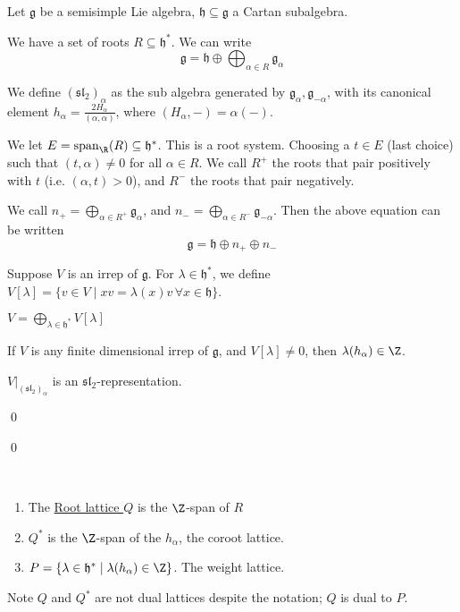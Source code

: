 \documentclass[x11names,reqno,14pt]{extarticle}
\newcommand{\mk}[1]{\mathfrak{#1}}
\newcommand{\g}{\mk{g}}
\newcommand{\h}{\mk{h}}
\renewcommand{\sl}{\mk{s}\mk{l}}
\DeclareMathOperator{\Span}{span}
\begin{document}
Let $\g$ be a semisimple Lie algebra, $\h \subseteq \g$ a Cartan subalgebra. 

We have a set of roots $R \subseteq \h^*$. We can write 
\[
\g = \h \oplus \bigoplus_{\alpha\in R}\g_\alpha
\]

We define $(\sl_2)_\alpha$ as the sub algebra generated by $\g_\alpha,\g_{-\alpha}$, with its canonical element $h_\alpha = \frac{2H_\alpha}{(\alpha,\alpha)}$, where $(H_\alpha,-) = \alpha(-)$. 

We let $E = \Span_\R(R)\subseteq\h^*$. This is a root system. Choosing a $t \in E$ (last choice) such that $(t,\alpha)\neq0$ for all $\alpha \in R$. We call $R^+$ the roots that pair positively with $t$ (i.e. $(\alpha,t) > 0$), and $R^-$ the roots that pair negatively. 

We call $n_+ = \bigoplus_{\alpha \in R^+}\g_\alpha$, and $n_- = \bigoplus_{\alpha\in R^-}\g_{-\alpha}$. Then the above equation can be written 
\[
\g = \h\oplus n_+\oplus n_-
\]

Suppose $V$ is an irrep of $\g$. For $\lambda\in\h^*$, we define $V[\lambda] = \{v\in V \mid xv = \lambda(x)v\,\forall x \in \h\}$. 

\prop

$V = \bigoplus_{\lambda\in\h^*}V[\lambda]$

\proof

\prop

If $V$ is any finite dimensional irrep of $\g$, and $V[\lambda] \neq 0$, then $\lambda(h_\alpha) \in \Z$. 

\proof

$V|_{(\sl_2)_\alpha}$ is an $\sl_2$-representation.

\qed

\qed

\,
\begin{enumerate}

\item The \underline{Root lattice $Q$} is the $\Z$-span of $R$

\item $Q^*$ is the $\Z$-span of the $h_\alpha$, the coroot lattice.

\item $P = \{\lambda \in \h^* \mid \lambda(h_\alpha)\in\Z\}$. The weight lattice.

\end{enumerate}

Note $Q$ and $Q^*$ are not dual lattices despite the notation; $Q$ is dual to $P$. 
\end{document}
